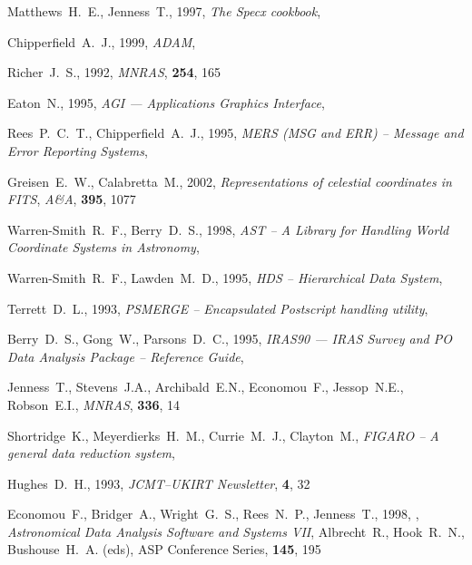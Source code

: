 \documentclass[twoside,11pt]{starlink}
\begin{document}
\begin{thebibliography}{}
Matthews~H.~E., Jenness~T., 1997,
\textit{The Specx cookbook}, 

Chipperfield~A.~J., 1999,
\textit{ADAM}, 

Richer~J.~S., 1992, \textit{MNRAS}, \textbf{254}, 165

Eaton~N., 1995, \textit{AGI --- Applications Graphics Interface},

Rees~P.~C.~T., Chipperfield~A.~J., 1995, \textit{MERS (MSG and ERR) -- Message
and Error Reporting Systems}, 

Greisen~E.~W., Calabretta~M., 2002, \textit{Representations of celestial
coordinates in FITS}, \textit{A\&A}, \textbf{395}, 1077

Warren-Smith~R.~F., Berry~D.~S., 1998, \textit{AST -- A Library for Handling
World Coordinate Systems in Astronomy},

Warren-Smith~R.~F., Lawden~M.~D., 1995, \textit{HDS -- Hierarchical Data System},

Terrett~D.~L., 1993, \textit{PSMERGE -- Encapsulated Postscript handling utility},

Berry~D.~S., Gong~W., Parsons~D.~C., 1995, \textit{IRAS90 --- IRAS Survey and PO
Data Analysis Package -- Reference Guide}, 

Jenness~T., Stevens~J.A., Archibald~E.N., Economou~F., Jessop~N.E.,
Robson~E.I., \textit{MNRAS}, \textbf{336}, 14


Shortridge~K., Meyerdierks~H.~M., Currie~M.~J., Clayton~M.,
\textit{FIGARO -- A general data reduction system},

Hughes~D.~H., 1993, \textit{JCMT--UKIRT Newsletter}, \textbf{4}, 32

Economou~F., Bridger~A., Wright~G.~S., Rees~N.~P., Jenness~T., 1998,
,
\emph{Astronomical Data Analysis Software and Systems VII}, Albrecht~R.,
Hook~R.~N., Bushouse~H.~A. (eds), ASP Conference Series, \textbf{145}, 195


\end{thebibliography}
\end{document}
